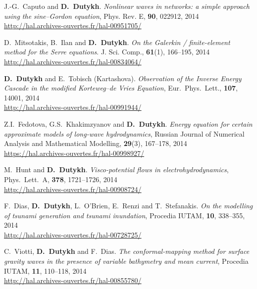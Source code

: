 \documentclass[final, a4paper, oneside, 12pt]{article}
\numberwithin{equation}{section}
\begin{document}
\begin{etaremune}
  \item J.-G.~Caputo and \textbf{D.~Dutykh}. \textit{Nonlinear waves in networks: a simple approach using the sine--Gordon equation}, Phys. Rev. E, \textbf{90}, 022912, 2014 \\ %
  \url{http://hal.archives-ouvertes.fr/hal-00951705/}
  
  \item D.~Mitsotakis, B.~Ilan and \textbf{D.~Dutykh}. \textit{On the Galerkin / finite-element method for the Serre equations}. J. Sci. Comp., \textbf{61}(1), 166--195, 2014 \\ %
  \url{http://hal.archives-ouvertes.fr/hal-00834064/}
  
  \item \textbf{D.~Dutykh} and E.~Tobisch (Kartashova). \textit{Observation of the Inverse Energy Cascade in the modified Korteweg--de Vries Equation}, Eur.~Phys.~Lett., \textbf{107}, 14001, 2014 \\ %
  \url{http://hal.archives-ouvertes.fr/hal-00991944/}
  
  \item Z.I.~Fedotova, G.S.~Khakimzyanov and \textbf{D.~Dutykh}. \textit{Energy equation for certain approximate models of long-wave hydrodynamics}, Russian Journal of Numerical Analysis and Mathematical Modelling, \textbf{29}(3), 167--178, 2014 \\ %
  \url{https://hal.archives-ouvertes.fr/hal-00998927/}
  
  \item M.~Hunt and \textbf{D.~Dutykh}. \textit{Visco-potential flows in electrohydrodynamics}, Phys.~Lett.~A, \textbf{378}, 1721--1726, 2014 \\ %
  \url{http://hal.archives-ouvertes.fr/hal-00908724/}
  
  \item F.~Dias, \textbf{D.~Dutykh}, L.~O'Brien, E.~Renzi and T.~Stefanakis. \textit{On the modelling of tsunami generation and tsunami inundation}, Procedia IUTAM, \textbf{10}, 338--355, 2014 \\ %
  \url{http://hal.archives-ouvertes.fr/hal-00728725/}
  
  \item C.~Viotti, \textbf{D.~Dutykh} and F.~Dias. \textit{The conformal-mapping method for surface gravity waves in the presence of variable bathymetry and mean current}, Procedia IUTAM, \textbf{11}, 110--118, 2014 \\ %
  \url{http://hal.archives-ouvertes.fr/hal-00855780/}
  

\end{etaremune}
\end{document}
